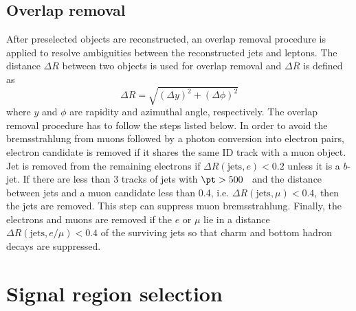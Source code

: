 
\subsection{Overlap removal}
\label{subsec:event_overlap_removal}
After preselected objects are reconstructed, an overlap removal procedure is applied to resolve ambiguities between the reconstructed jets and leptons.
The distance $\Delta R$ between two objects is used for overlap removal and $\Delta R$ is defined as
%
\begin{equation}
    \Delta R = \sqrt{(\Delta y)^{2} + (\Delta \phi)^{2}}
\end{equation}
%
where $y$ and $\phi$ are rapidity and azimuthal angle, respectively.
The overlap removal procedure has to follow the steps listed below.
In order to avoid the bremsstrahlung from muons followed by a photon conversion into electron pairs, electron candidate is removed if it shares the same ID track with a muon object.
Jet is removed from the remaining electrons if $\Delta R(\mathrm{jets}, e) < 0.2$ unless it is a $b$-jet.
If there are less than 3 tracks of jets with $\pt > 500$~{\MeV} and the distance between jets and a muon candidate less than 0.4, i.e. $\Delta R(\mathrm{jets}, \mu) < 0.4$, then the jets are removed.
This step can suppress muon bremsstrahlung.
Finally, the electrons and muons are removed if the $e$ or $\mu$ lie in a distance $\Delta R(\mathrm{jets}, e/\mu) < 0.4$ of the surviving jets so that charm and bottom hadron decays are suppressed.


\section{Signal region selection}
\label{sec:event_signal_region_selection}


